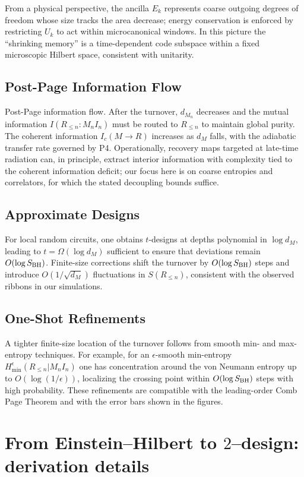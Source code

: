 \documentclass[aps,prd,preprint,onecolumn,superscriptaddress,nofootinbib,longbibliography,floatfix,11pt,showpacs,showkeys]{revtex4-2}
\theoremstyle{plain}
\theoremstyle{definition}
\theoremstyle{remark}
\begin{document}
From a physical perspective, the ancilla $E_k$ represents coarse outgoing degrees of freedom whose size tracks the area decrease; energy conservation is enforced by restricting $U_k$ to act within microcanonical windows. In this picture the ``shrinking memory'' is a time-dependent code subspace within a fixed microscopic Hilbert space, consistent with unitarity.

\subsection{Post-Page Information Flow}
Post-Page information flow. After the turnover, $d_{M_n}$ decreases and the mutual information $I(R_{\le n}:M_n I_n)$ must be routed to $R_{\le n}$ to maintain global purity. The coherent information $I_c(M\to R)$ increases as $d_M$ falls, with the adiabatic transfer rate governed by P4. Operationally, recovery maps targeted at late-time radiation can, in principle, extract interior information with complexity tied to the coherent information deficit; our focus here is on coarse entropies and correlators, for which the stated decoupling bounds suffice.

\subsection{Approximate Designs}
For local random circuits, one obtains $t$-designs at depths polynomial in $\log d_M$, leading to $t=\Omega(\log d_M)$ sufficient to ensure that deviations remain $O(\log S_{\rm BH})$. Finite-size corrections shift the turnover by $O(\log S_{\rm BH})$ steps and introduce $O(1/\sqrt{d_M})$ fluctuations in $S(R_{\le n})$, consistent with the observed ribbons in our simulations.

\subsection{One-Shot Refinements}
A tighter finite-size location of the turnover follows from smooth min- and max-entropy techniques. For example, for an $\epsilon$-smooth min-entropy $H_{\min}^{\epsilon}(R_{\le n}|M_n I_n)$ one has concentration around the von Neumann entropy up to $O(\log(1/\epsilon))$, localizing the crossing point within $O(\log S_{\rm BH})$ steps with high probability. These refinements are compatible with the leading-order Comb Page Theorem and with the error bars shown in the figures.

\section{From Einstein--Hilbert to \texorpdfstring{$2$}{2}--design: derivation details}
\label{app:EH-2design}
\end{document}

